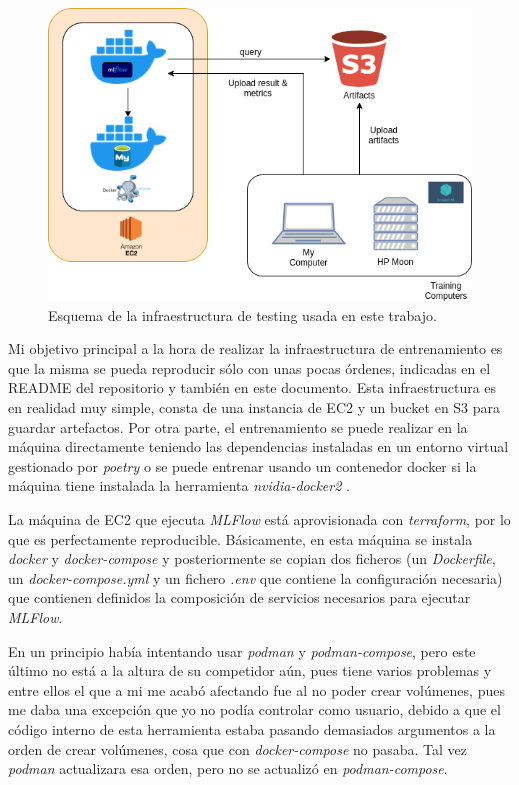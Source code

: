 \begin{figure}[H]
	\includegraphics[width=1.\linewidth]{imagenes/05_Implementacion/traininfra.png}
	\centering
	\caption{Esquema de la infraestructura de testing usada en este trabajo.}
\end{figure}

Mi objetivo principal a la hora de realizar la infraestructura de entrenamiento es que la misma se pueda reproducir sólo con unas pocas órdenes, indicadas en el README del repositorio y también en este documento. Esta infraestructura es en realidad muy simple, consta de una instancia de EC2 y un bucket en S3 para guardar artefactos. Por otra parte, el entrenamiento se puede realizar en la máquina directamente teniendo las dependencias instaladas en un entorno virtual gestionado por \textit{poetry} o se puede entrenar usando un contenedor docker si la máquina tiene instalada la herramienta \textit{nvidia-docker2} \cite{nvidiadocker}.\newline

La máquina de EC2 que ejecuta \textit{MLFlow} está aprovisionada con \textit{terraform}, por lo que es perfectamente reproducible. Básicamente, en esta máquina se instala \textit{docker} y \textit{docker-compose} y posteriormente se copian dos ficheros (un \textit{Dockerfile}, un \textit{docker-compose.yml} y un fichero \textit{.env} que contiene la configuración necesaria) que contienen definidos la composición de servicios necesarios para ejecutar \textit{MLFlow}.\newline

En un principio había intentando usar \textit{podman} y \textit{podman-compose}, pero este último no está a la altura de su competidor aún, pues tiene varios problemas y entre ellos el que a mi me acabó afectando fue al no poder crear volúmenes, pues me daba una excepción que yo no podía controlar como usuario, debido a que el código interno de esta herramienta estaba pasando demasiados argumentos a la orden de crear volúmenes, cosa que con \textit{docker-compose} no pasaba. Tal vez \textit{podman} actualizara esa orden, pero no se actualizó en \textit{podman-compose}.\newline

